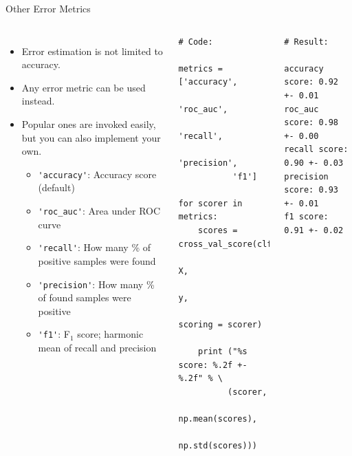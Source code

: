 \documentclass[10pt, aspectratio=169]{beamer} %
\begin{document}
\begin{frame}[fragile]{Other Error Metrics}
\begin{columns}
{\small\vspace*{-0.8cm}
\begin{itemize}
\item Error estimation is not limited to accuracy.
\item Any error metric can be used instead.
\item Popular ones are invoked easily, but you can also implement your own.
\begin{itemize}
	\item {\verb+'accuracy'+}: Accuracy score (default)
	\item {\verb+'roc_auc'+}: Area under ROC curve
  \item {\verb+'recall'+}: How many \% of positive samples were found
	\item {\verb+'precision'+}: How many \% of found samples were positive
	\item {\verb+'f1'+}: F$_1$ score; harmonic mean of recall and precision
\end{itemize}
\end{itemize}
}
\begin{lstlisting}
# Code:

metrics = ['accuracy',
           'roc_auc',
           'recall',
           'precision',
           'f1']

for scorer in metrics:
    scores = cross_val_score(clf, 
                   X, 
                   y, 
                   scoring = scorer)

    print ("%s score: %.2f +- %.2f" % \
          (scorer,
           np.mean(scores),
           np.std(scores)))
\end{lstlisting}
\begin{lstlisting}
# Result:

accuracy score: 0.92 +- 0.01
roc_auc score: 0.98 +- 0.00
recall score: 0.90 +- 0.03
precision score: 0.93 +- 0.01
f1 score: 0.91 +- 0.02
\end{lstlisting}
\end{columns}
\end{frame}
\end{document}
